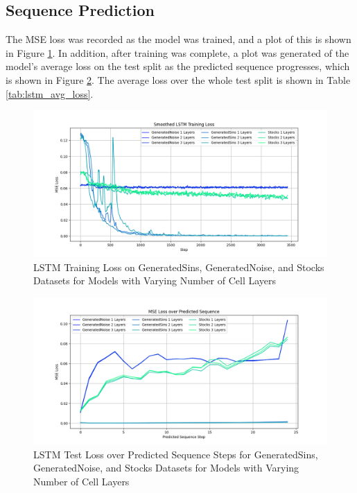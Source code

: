 \documentclass{scrartcl}
\begin{document}

\subsection{Sequence Prediction}
\label{subsec:experiment_sp}

The MSE loss was recorded as the model was trained, and a plot of this is shown
in Figure \ref{plt:lstm_train_loss}. In addition, after training was complete,
a plot was generated of the model's average loss on the test split as the
predicted sequence progresses, which is shown in Figure
\ref{plt:lstm_seq_loss}. The average loss over the whole test split is shown in
Table \ref{tab:lstm_avg_loss}.

\begin{figure}[H]
	\begin{center}
		\includegraphics[width=1\textwidth]{plots/lstm_train_loss.png}
	\end{center}
	\caption{LSTM Training Loss on GeneratedSins, GeneratedNoise, and Stocks
	Datasets for Models with Varying Number of Cell Layers}
	\label{plt:lstm_train_loss}
\end{figure}

\begin{figure}[H]
	\begin{center}
		\includegraphics[width=1\textwidth]{plots/lstm_seq_loss.png}
	\end{center}
	\caption{LSTM Test Loss over Predicted Sequence Steps for GeneratedSins, GeneratedNoise, and Stocks Datasets for Models 
	with Varying Number of Cell Layers}
	\label{plt:lstm_seq_loss}
\end{figure}
\end{document}
